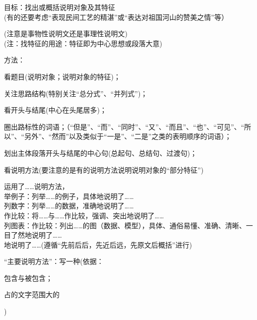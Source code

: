 {
目标：找出或概括说明对象及其特征\\
(有的还要考虑``表现民间工艺的精湛''或``表达对祖国河山的赞美之情''等）\par
(注意是事物性说明文还是事理性说明文)\\
(注：找特征的用途：特征即为中心思想或段落大意)\par
方法：\begin{asparaenum}[(1)]\item 看题目(说明对象；说明对象的特征)；
        \item 关注思路结构(特别关注``总分式''、``并列式'')；
        \item 看开头与结尾(中心在头尾居多)；
        \item 圈出路标性的词语；（``但是''、``而''、``同时''、``又''、``而且''、``也''、``可见''、``所以''、``另外''、``然而''以及类似于``一是''、``二是''之类的表明顺序的词语）；
        \item 划出主体段落开头与结尾的中心句(总起句、总结句、过渡句)；
        \item 看说明方法(要注意的是有的说明方法说明说明对象的``部分特征'')\end{asparaenum}

运用了\ldots{}\ldots{}说明方法，\\
举例子：列举\ldots{}\ldots{}的例子，具体地说明了\ldots{}\ldots{}\\
列数字：列举\ldots{}\ldots{}的数据，准确地说明了\ldots{}\ldots{}\\
作比较：将\ldots{}\ldots{}与\ldots{}\ldots{}作比较，强调、突出地说明了\ldots{}\ldots{}\\
列图表：作比较：列出\ldots{}\ldots{}的图（数据、模型），具体、通俗易懂、准确、清晰、一目了然地说明了\ldots{}\ldots{}\\
地说明了\ldots{}\ldots{}(遵循``先前后后，先近后远，先原文后概括''进行)\par
``主要说明方法''：写一种(依据：\begin{inparaenum}[(1)]\item 包含与被包含；\item 占的文字范围大的\end{inparaenum})\\
\\
\\
\\
\\

}
